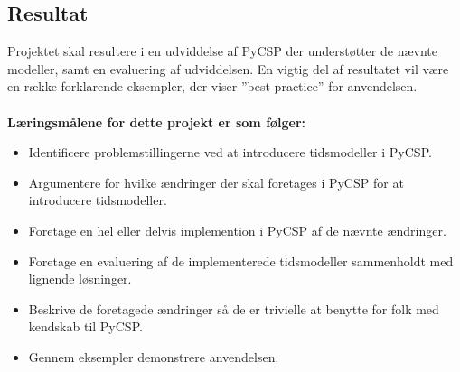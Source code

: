 

\subsection*{Resultat}
Projektet skal resultere i en udviddelse af PyCSP der understøtter de nævnte modeller, samt en evaluering af udviddelsen. En vigtig del af resultatet vil være en række forklarende eksempler, der viser ''best practice'' for anvendelsen.
\\
\\
\textbf{Læringsmålene for dette projekt er som følger:}

\begin{itemize}
 \item Identificere problemstillingerne ved at introducere tidsmodeller i PyCSP.
 \item Argumentere for hvilke ændringer  der skal foretages i PyCSP for at introducere tidsmodeller.
 \item Foretage en hel eller delvis implemention i PyCSP af de nævnte ændringer.
 \item Foretage en evaluering af de implementerede tidsmodeller sammenholdt med lignende løsninger.
 \item Beskrive de foretagede ændringer så de er trivielle at benytte for folk med kendskab til PyCSP.
 \item Gennem eksempler demonstrere anvendelsen.
\end{itemize}

